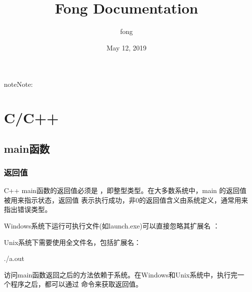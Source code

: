 \documentclass[letterpaper,10pt,english]{sphinxmanual}
\title{Fong Documentation}
\date{May 12, 2019}
\author{fong}
\begin{document}
\maketitle
\sphinxtableofcontents
{}\label{\detokenize{index::doc}}


\begin{sphinxadmonition}{note}{Note:}


\end{sphinxadmonition}


\chapter{C/C++}
\label{\detokenize{cpp/index:c-c}}\label{\detokenize{cpp/index::doc}}\label{\detokenize{cpp/index:id1}}

\section{main函数}
\label{\detokenize{cpp/01_main:main}}\label{\detokenize{cpp/01_main::doc}}

\subsection{返回值}
\label{\detokenize{cpp/01_main:id1}}
C++ main函数的返回值必须是  ，即整型类型。在大多数系统中，main 的返回值被用来指示状态，返回值  表示执行成功，非0的返回值含义由系统定义，通常用来指出错误类型。

Windows系统下运行可执行文件(如launch.exe)可以直接忽略其扩展名  ：

%
\begin{sphinxVerbatim}[commandchars=\\\{\}]
\end{sphinxVerbatim}

Unix系统下需要使用全文件名，包括扩展名：

%
\begin{sphinxVerbatim}[commandchars=\\\{\}]
./a.out
\end{sphinxVerbatim}

访问main函数返回之后的方法依赖于系统。在Windows和Unix系统中，执行完一个程序之后，都可以通过  命令来获取返回值。
\end{document}
